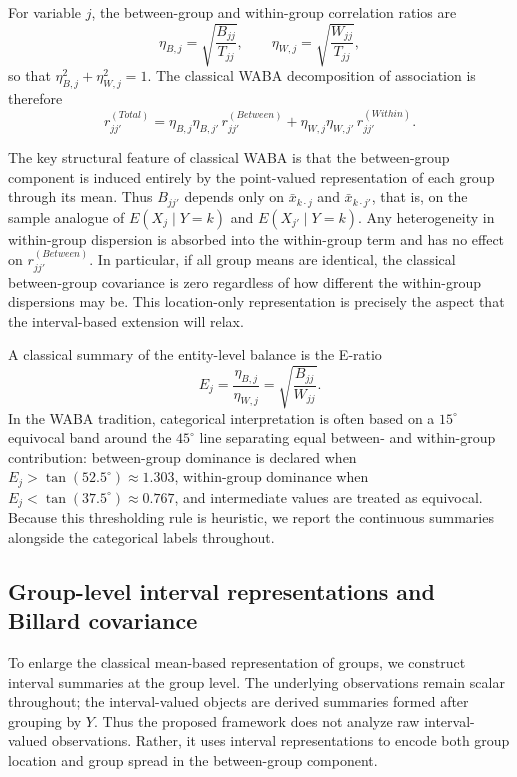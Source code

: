 \documentclass[preprint, times, 12pt, authoryear]{elsarticle}
\begin{document}
For variable $j$, the between-group and within-group correlation ratios are
\begin{equation}\label{eq:eta}
	\eta_{B,j}=\sqrt{\frac{B_{jj}}{T_{jj}}},\qquad
	\eta_{W,j}=\sqrt{\frac{W_{jj}}{T_{jj}}},
\end{equation}
so that $\eta_{B,j}^2+\eta_{W,j}^2=1$. The classical WABA decomposition of association is therefore
\begin{equation}\label{eq:waba}
	r_{jj'}^{(Total)}
	=
	\eta_{B,j}\eta_{B,j'}\,r_{jj'}^{(Between)}
	+
	\eta_{W,j}\eta_{W,j'}\,r_{jj'}^{(Within)}.
\end{equation}

The key structural feature of classical WABA is that the between-group component is induced entirely by the point-valued representation of each group through its mean. Thus $B_{jj'}$ depends only on $\bar{x}_{k\cdot j}$ and $\bar{x}_{k\cdot j'}$, that is, on the sample analogue of $E(X_j\mid Y=k)$ and $E(X_{j'}\mid Y=k)$. Any heterogeneity in within-group dispersion is absorbed into the within-group term and has no effect on $r_{jj'}^{(Between)}$. In particular, if all group means are identical, the classical between-group covariance is zero regardless of how different the within-group dispersions may be. This location-only representation is precisely the aspect that the interval-based extension will relax.

A classical summary of the entity-level balance is the E-ratio
\[
E_j=\frac{\eta_{B,j}}{\eta_{W,j}}=\sqrt{\frac{B_{jj}}{W_{jj}}}.
\]
In the WABA tradition, categorical interpretation is often based on a $15^\circ$ equivocal band around the $45^\circ$ line separating equal between- and within-group contribution: between-group dominance is declared when $E_j>\tan(52.5^\circ)\approx 1.303$, within-group dominance when $E_j<\tan(37.5^\circ)\approx 0.767$, and intermediate values are treated as equivocal. Because this thresholding rule is heuristic, we report the continuous summaries alongside the categorical labels throughout.


\subsection{Group-level interval representations and Billard covariance}\label{sec:sda}

To enlarge the classical mean-based representation of groups, we construct interval summaries at the group level. The underlying observations remain scalar throughout; the interval-valued objects are derived summaries formed after grouping by $Y$. Thus the proposed framework does not analyze raw interval-valued observations. Rather, it uses interval representations to encode both group location and group spread in the between-group component.
\end{document}
